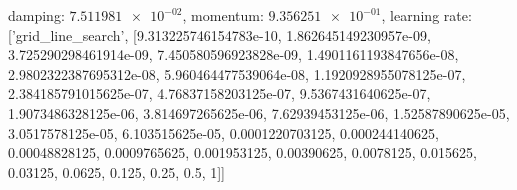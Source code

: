 damping: $\num[scientific-notation=true]{7.511981e-02}$, momentum: $\num[scientific-notation=true]{9.356251e-01}$, learning rate: ['grid_line_search', [9.313225746154783e-10, 1.862645149230957e-09, 3.725290298461914e-09, 7.450580596923828e-09, 1.4901161193847656e-08, 2.9802322387695312e-08, 5.960464477539064e-08, 1.1920928955078125e-07, 2.384185791015625e-07, 4.76837158203125e-07, 9.5367431640625e-07, 1.9073486328125e-06, 3.814697265625e-06, 7.62939453125e-06, 1.52587890625e-05, 3.0517578125e-05, 6.103515625e-05, 0.0001220703125, 0.000244140625, 0.00048828125, 0.0009765625, 0.001953125, 0.00390625, 0.0078125, 0.015625, 0.03125, 0.0625, 0.125, 0.25, 0.5, 1]]